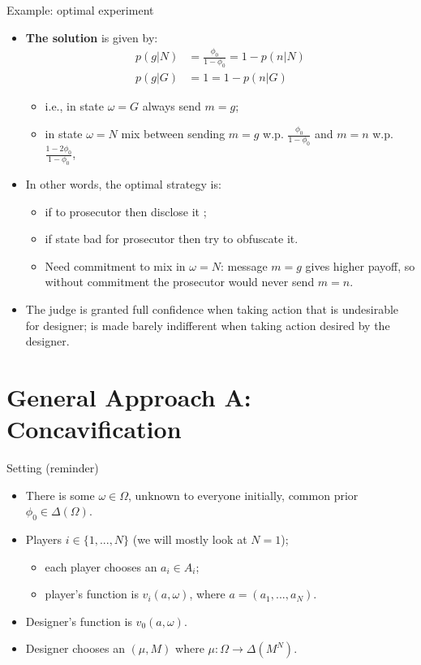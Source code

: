 \documentclass[english,10pt
,aspectratio=169
]{beamer}
\begin{document}
\begin{frame}{Example: optimal experiment}
\begin{itemize}
	\item \textbf{The solution} is given by:
	\vspace{-1em}\begin{align*}
		p(g|N) &= \frac{\phi_0}{1-\phi_0} = 1-p(n|N)
		\\
		p(g|G) &= 1 = 1-p(n|G)
	\end{align*}\vspace{-2em}
	\begin{itemize}
		\item i.e., in state $\omega=G$ always send $m=g$;
		\item in state $\omega=N$ mix between sending $m=g$ w.p. $\frac{\phi_0}{1-\phi_0}$ and $m=n$ w.p. $\frac{1-2\phi_0}{1-\phi_0}$,
	\end{itemize}
	\item In other words, the optimal strategy is:
	\begin{itemize}
		\item if  to prosecutor then disclose it ;
		\item if \alert{state bad} for prosecutor then try to \alert{obfuscate} it.
		\item Need \alert{commitment} to mix in $\omega=N$: message $m=g$ gives higher payoff, so without commitment the prosecutor would never send $m=n$.
	\end{itemize}
	\item The judge is granted full confidence when taking action that is undesirable for designer; is made barely indifferent when taking action desired by the designer.
\end{itemize}
\end{frame}



\section{General Approach A: Concavification}

\begin{frame}{Setting (reminder)}
\begin{itemize}
	\item There is some  $\omega \in \Omega$, unknown to everyone initially, common prior $\phi_0 \in \varDelta(\Omega)$.
	\item \alert{Players} $i \in \{1,...,N\}$ (we will mostly look at $N=1$);
	\begin{itemize}
		\item each player chooses an  $a_i \in A_i$;
		\item player's  function is $v_i(a, \omega)$, where $a = (a_1, ..., a_N)$.
	\end{itemize}
	\item \alert{Designer's}  function is $v_0(a, \omega)$.
	\item Designer chooses an  $(\mu,M)$ where $\mu: \Omega \to \varDelta(M^N)$.
\end{itemize}
\end{frame}
\end{document}
